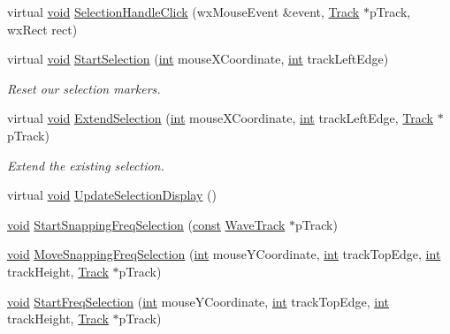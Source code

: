 \begin{DoxyCompactItemize}
\item 
virtual \hyperlink{sound_8c_ae35f5844602719cf66324f4de2a658b3}{void} \hyperlink{class_track_panel_accf5fa5e64ce4ad8c27f583cbec05892}{Selection\+Handle\+Click} (wx\+Mouse\+Event \&event, \hyperlink{class_track}{Track} $\ast$p\+Track, wx\+Rect rect)
\item 
virtual \hyperlink{sound_8c_ae35f5844602719cf66324f4de2a658b3}{void} \hyperlink{class_track_panel_a1393ba16f6bf7ef757de651a5c088a47}{Start\+Selection} (\hyperlink{xmltok_8h_a5a0d4a5641ce434f1d23533f2b2e6653}{int} mouse\+X\+Coordinate, \hyperlink{xmltok_8h_a5a0d4a5641ce434f1d23533f2b2e6653}{int} track\+Left\+Edge)
\begin{DoxyCompactList}\small\item\em Reset our selection markers. \end{DoxyCompactList}\item 
virtual \hyperlink{sound_8c_ae35f5844602719cf66324f4de2a658b3}{void} \hyperlink{class_track_panel_a5cf09e7e916859a38c285041fbfcc8e8}{Extend\+Selection} (\hyperlink{xmltok_8h_a5a0d4a5641ce434f1d23533f2b2e6653}{int} mouse\+X\+Coordinate, \hyperlink{xmltok_8h_a5a0d4a5641ce434f1d23533f2b2e6653}{int} track\+Left\+Edge, \hyperlink{class_track}{Track} $\ast$p\+Track)
\begin{DoxyCompactList}\small\item\em Extend the existing selection. \end{DoxyCompactList}\item 
virtual \hyperlink{sound_8c_ae35f5844602719cf66324f4de2a658b3}{void} \hyperlink{class_track_panel_a6999c7cb8ccf65bb81c6fe93c8c9ac03}{Update\+Selection\+Display} ()
\item 
\hyperlink{sound_8c_ae35f5844602719cf66324f4de2a658b3}{void} \hyperlink{class_track_panel_a2d3b5f434fa616850942dc3e93d606e7}{Start\+Snapping\+Freq\+Selection} (\hyperlink{getopt1_8c_a2c212835823e3c54a8ab6d95c652660e}{const} \hyperlink{class_wave_track}{Wave\+Track} $\ast$p\+Track)
\item 
\hyperlink{sound_8c_ae35f5844602719cf66324f4de2a658b3}{void} \hyperlink{class_track_panel_a49be30774780343754f3de5719cfd1dc}{Move\+Snapping\+Freq\+Selection} (\hyperlink{xmltok_8h_a5a0d4a5641ce434f1d23533f2b2e6653}{int} mouse\+Y\+Coordinate, \hyperlink{xmltok_8h_a5a0d4a5641ce434f1d23533f2b2e6653}{int} track\+Top\+Edge, \hyperlink{xmltok_8h_a5a0d4a5641ce434f1d23533f2b2e6653}{int} track\+Height, \hyperlink{class_track}{Track} $\ast$p\+Track)
\item 
\hyperlink{sound_8c_ae35f5844602719cf66324f4de2a658b3}{void} \hyperlink{class_track_panel_a3b7e87dc5fb6cd9d90ea40bf8e9a0cd5}{Start\+Freq\+Selection} (\hyperlink{xmltok_8h_a5a0d4a5641ce434f1d23533f2b2e6653}{int} mouse\+Y\+Coordinate, \hyperlink{xmltok_8h_a5a0d4a5641ce434f1d23533f2b2e6653}{int} track\+Top\+Edge, \hyperlink{xmltok_8h_a5a0d4a5641ce434f1d23533f2b2e6653}{int} track\+Height, \hyperlink{class_track}{Track} $\ast$p\+Track)

\end{DoxyCompactItemize}
